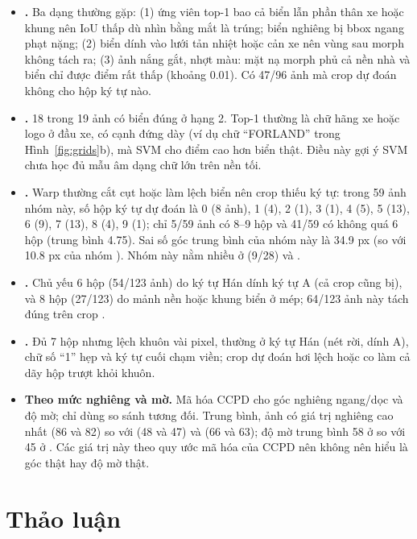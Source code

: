 \begin{itemize}
  \item \textbf{.} Ba dạng thường gặp: (1) ứng viên top-1 bao cả biển lẫn phần thân xe hoặc khung nên IoU thấp dù nhìn bằng mắt là trúng; biển nghiêng bị bbox ngang phạt nặng; (2) biển dính vào lưới tản nhiệt hoặc cản xe nên vùng sau morph không tách ra; (3) ảnh  nắng gắt, nhợt màu: mặt nạ morph phủ cả nền nhà và biển chỉ được điểm rất thấp (khoảng 0.01). Có 47/96 ảnh mà crop dự đoán không cho hộp ký tự nào.
  \item \textbf{.} 18 trong 19 ảnh có biển đúng ở hạng 2. Top-1 thường là chữ hãng xe hoặc logo ở đầu xe, có cạnh đứng dày (ví dụ chữ ``FORLAND'' trong Hình~\ref{fig:grids}b), mà SVM cho điểm cao hơn biển thật. Điều này gợi ý SVM chưa học đủ mẫu âm dạng chữ lớn trên nền tối.
  \item \textbf{.} Warp thường cắt cụt hoặc làm lệch biển nên crop thiếu ký tự: trong 59 ảnh nhóm này, số hộp ký tự dự đoán là 0 (8 ảnh), 1 (4), 2 (1), 3 (1), 4 (5), 5 (13), 6 (9), 7 (13), 8 (4), 9 (1); chỉ 5/59 ảnh có 8--9 hộp và 41/59 có không quá 6 hộp (trung bình 4.75). Sai số góc trung bình của nhóm này là 34.9 px (so với 10.8 px của nhóm ). Nhóm này nằm nhiều ở  (9/28) và .
  \item \textbf{.} Chủ yếu 6 hộp (54/123 ảnh) do ký tự Hán dính ký tự A (cả crop  cũng bị), và 8 hộp (27/123) do mảnh nền hoặc khung biển ở mép; 64/123 ảnh này tách đúng trên crop .
  \item \textbf{.} Đủ 7 hộp nhưng lệch khuôn vài pixel, thường ở ký tự Hán (nét rời, dính A), chữ số ``1'' hẹp và ký tự cuối chạm viền; crop dự đoán hơi lệch hoặc co làm cả dãy hộp trượt khỏi khuôn.
  \item {\sloppy \textbf{Theo mức nghiêng và mờ.} Mã hóa CCPD cho góc nghiêng ngang/dọc và độ mờ; chỉ dùng so sánh tương đối. Trung bình, ảnh  có giá trị nghiêng cao nhất (86 và 82) so với  (48 và 47) và  (66 và 63); độ mờ trung bình 58 ở  so với 45 ở . Các giá trị này theo quy ước mã hóa của CCPD nên không nên hiểu là góc thật hay độ mờ thật.\par}
\end{itemize}

\section{Thảo luận}
\label{sec:discuss}

